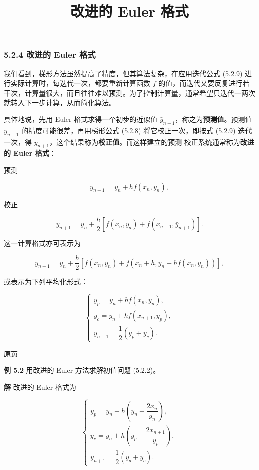 \documentclass[
  10pt,
  fontset=fandol]{ctexart}
\title{改进的 Euler 格式}
\author{}
\date{}
\begin{document}
\maketitle

\subsubsection{5.2.4 改进的 Euler 格式}\label{ux6539ux8fdbux7684-euler-ux683cux5f0f}

我们看到，梯形方法虽然提高了精度，但其算法复杂，在应用迭代公式 (5.2.9) 进行实际计算时，每迭代一次，都要重新计算函数 \(f\) 的值，而迭代又要反复进行若干次，计算量很大，而且往往难以预测。为了控制计算量，通常希望只迭代一两次就转入下一步计算，从而简化算法。

具体地说，先用 Euler 格式求得一个初步的近似值 \(\bar y_{n+1}\)，称之为\textbf{预测值}。预测值 \(\bar y_{n+1}\) 的精度可能很差，再用梯形公式 (5.2.8) 将它校正一次，即按式 (5.2.9) 迭代一次，得 \(y_{n+1}\)，这个结果称为\textbf{校正值}。而这样建立的预测-校正系统通常称为\textbf{改进的 Euler 格式}：

预测

\[
\bar y_{n+1}=y_n+hf(x_n,y_n),\tag{5.2.10}
\]

校正

\[
y_{n+1}=y_n+\frac{h}{2}[f(x_n,y_n)+f(x_{n+1},\bar y_{n+1})].\tag{5.2.11}
\]

这一计算格式亦可表示为

\[
y_{n+1}=y_n+\frac{h}{2}[f(x_n,y_n)+f(x_n+h,y_n+hf(x_n,y_n))],\tag{5.2.12}
\]

或表示为下列平均化形式：

\[
\begin{cases}
y_p=y_n+hf(x_n,y_n),\\
y_c=y_n+hf(x_{n+1},y_p),\\
y_{n+1}=\dfrac{1}{2}(y_p+y_c).
\end{cases}
\]

\href{../../source-images/pdf-124.jpeg}{原页}

\textbf{例 5.2} 用改进的 Euler 方法求解初值问题 (5.2.2)。

\textbf{解} 改进的 Euler 格式为

\[
\begin{cases}
y_p=y_n+h\left(y_n-\dfrac{2x_n}{y_n}\right),\\
y_c=y_n+h\left(y_p-\dfrac{2x_{n+1}}{y_p}\right),\\
y_{n+1}=\dfrac{1}{2}(y_p+y_c).
\end{cases}
\]
\end{document}
